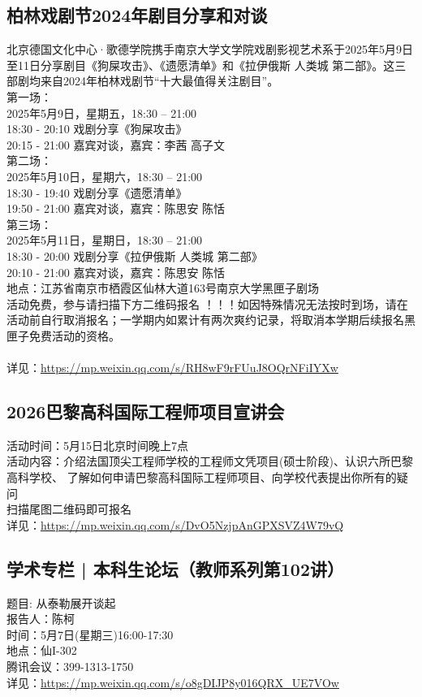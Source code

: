 \documentclass[letterpaper, 12pt]{article}
\begin{document}
\begin{multicols}{2}
\subsection{柏林戏剧节2024年剧目分享和对谈} %
北京德国文化中心·歌德学院携手南京大学文学院戏剧影视艺术系于2025年5月9日至11日分享剧目《狗屎攻击》、《遗愿清单》和《拉伊俄斯 人类城 第二部》。这三部剧均来自2024年柏林戏剧节“十大最值得关注剧目”。
\\第一场：
\\2025年5月9日，星期五，18:30 – 21:00
\\18:30 - 20:10 戏剧分享《狗屎攻击》
\\20:15 - 21:00 嘉宾对谈，嘉宾：李茜 高子文
\\第二场：
\\2025年5月10日，星期六，18:30 – 21:00
\\18:30 - 19:40 戏剧分享《遗愿清单》
\\19:50 - 21:00 嘉宾对谈，嘉宾：陈思安 陈恬
\\第三场：
\\2025年5月11日，星期日，18:30 – 21:00
\\18:30 - 20:00 戏剧分享《拉伊俄斯 人类城 第二部》
\\20:10 - 21:00 嘉宾对谈，嘉宾：陈思安 陈恬
\\地点：江苏省南京市栖霞区仙林大道163号南京大学黑匣子剧场 
\\活动免费，参与请扫描下方二维码报名 ！！！如因特殊情况无法按时到场，请在活动前自行取消报名；一学期内如累计有两次爽约记录，将取消本学期后续报名黑匣子免费活动的资格。
\\
\\详见：\url{https://mp.weixin.qq.com/s/RH8wF9rFUuJ8OQrNFiIYXw}
\subsection{2026巴黎高科国际工程师项目宣讲会} %
活动时间：5月15日北京时间晚上7点
\\活动内容：介绍法国顶尖工程师学校的工程师文凭项目(硕士阶段)、认识六所巴黎高科学校、 了解如何申请巴黎高科国际工程师项目、向学校代表提出你所有的疑问
\\扫描尾图二维码即可报名
\\详见：\url{https://mp.weixin.qq.com/s/DvO5NzjpAnGPXSVZ4W79vQ}

\subsection{学术专栏 | 本科生论坛（教师系列第102讲）} %
题目: 从泰勒展开谈起
\\报告人：陈柯
\\时间：5月7日(星期三)16:00-17:30
\\地点：仙I-302
\\腾讯会议：399-1313-1750
\\详见：\url{https://mp.weixin.qq.com/s/o8gDIJP8y016QRX_UE7VOw}


\end{multicols}
\end{document}
